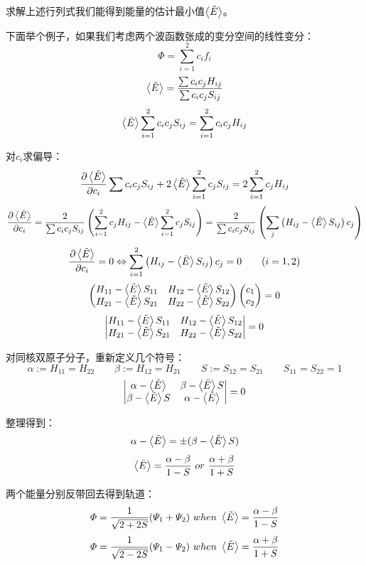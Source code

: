 求解上述行列式我们能得到能量的估计最小值$\expval{\tilde{E}}$。

下面举个例子，如果我们考虑两个波函数张成的变分空间的线性变分：
\[\varPhi=\sum_{i=1}^2c_if_i\]
\[\expval{\tilde{E}}=\frac{\sum c_ic_jH_{ij}}{\sum c_ic_jS_{ij}}\]
\[\expval{\tilde{E}}\sum_{i=1}^2 c_ic_jS_{ij}=\sum_{i=1}^2 c_ic_jH_{ij}\]

对$c_i$求偏导：
\[\frac{\partial \expval{\tilde{E}}}{\partial c_i}\sum c_ic_jS_{ij}+2\expval{\tilde{E}}\sum_{i=1}^2 c_jS_{ij}=2\sum_{i=1}^2 c_jH_{ij}\]
\[\frac{\partial \expval{\tilde{E}}}{\partial c_i}=\frac{2}{\sum c_ic_jS_{ij}}\left(\sum_{i=1}^2 c_jH_{ij}-\expval{\tilde{E}}\sum_{i=1}^2 c_jS_{ij}\right)=\frac{2}{\sum c_ic_jS_{ij}}\left(\sum_j \left (H_{ij}-\expval{\tilde{E}}S_{ij}\right )c_j\right)\]
\[\frac{\partial \expval{\tilde{E}}}{\partial c_i}=0 \Leftrightarrow \sum_{i=1}^2 \left (H_{ij}-\expval{\tilde{E}}S_{ij}\right )c_j=0 \qquad (i=1,2)\]
\[
\begin{pmatrix}
H_{11}-\expval{\tilde{E}}S_{11} & H_{12}-\expval{\tilde{E}}S_{12} \\
H_{21}-\expval{\tilde{E}}S_{21} & H_{22}-\expval{\tilde{E}}S_{22} \\
\end{pmatrix}
\begin{pmatrix}
c_1\\
c_2
\end{pmatrix}
=0
\]
\[
    \begin{vmatrix}
        H_{11}-\expval{\tilde{E}}S_{11} & H_{12}-\expval{\tilde{E}}S_{12} \\
        H_{21}-\expval{\tilde{E}}S_{21} & H_{22}-\expval{\tilde{E}}S_{22} \\
    \end{vmatrix}
    =0
\]

对同核双原子分子，重新定义几个符号：
\[\alpha:=H_{11}=H_{22} \qquad \beta:=H_{12}=H_{21} \qquad S:=S_{12}=S_{21} \qquad S_{11}=S_{22}=1\]
\[
    \begin{vmatrix}
        \alpha-\expval{\tilde{E}} & \beta-\expval{\tilde{E}}S \\
        \beta-\expval{\tilde{E}}S & \alpha-\expval{\tilde{E}} \\
    \end{vmatrix}
    =0
\]

整理得到：
\[\alpha-\expval{\tilde{E}}=\pm (\beta-\expval{\tilde{E}}S)\]
\[\expval{\tilde{E}}=\frac{\alpha-\beta}{1-S} \ or \ \frac{\alpha+\beta}{1+S}\]

两个能量分别反带回去得到轨道：
\[\varPhi=\frac{1}{\sqrt{2+2S}}(\varPsi_1+\varPsi_2) \ when \ \expval{\tilde{E}}=\frac{\alpha-\beta}{1-S}\] 
\[\varPhi=\frac{1}{\sqrt{2-2S}}(\varPsi_1-\varPsi_2) \ when \ \expval{\tilde{E}}=\frac{\alpha+\beta}{1+S}\]

